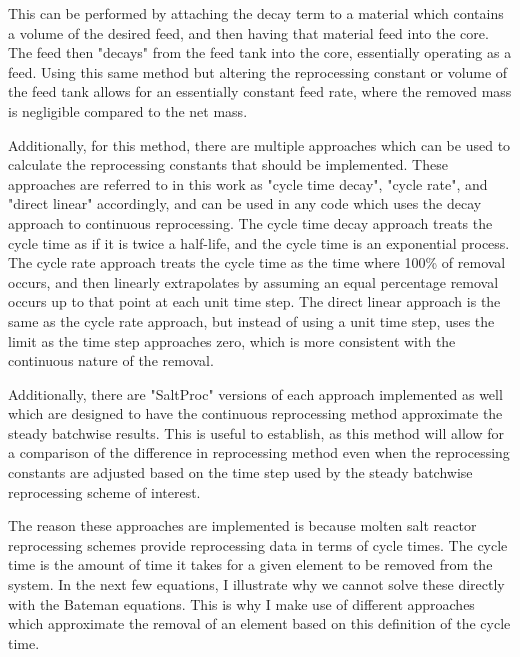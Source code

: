This can be performed by attaching the decay term to a material which contains a volume of the desired feed, and then having that material feed into the core. The feed then "decays" from the feed tank into the core, essentially operating as a feed. Using this same method but altering the reprocessing constant or volume of the feed tank allows for an essentially constant feed rate, where the removed mass is negligible compared to the net mass.

Additionally, for this method, there are multiple approaches which can be used to calculate the reprocessing constants that should be implemented. These approaches are referred to in this work as "cycle time decay", "cycle rate", and "direct linear" accordingly, and can be used in any code which uses the decay approach to continuous reprocessing. The cycle time decay approach treats the cycle time as if it is twice a half-life, and the cycle time is an exponential process. The cycle rate approach treats the cycle time as the time where 100\% of removal occurs, and then linearly extrapolates by assuming an equal percentage removal occurs up to that point at each unit time step. The direct linear approach is the same as the cycle rate approach, but instead of using a unit time step, uses the limit as the time step approaches zero, which is more consistent with the continuous nature of the removal.

Additionally, there are "SaltProc" versions of each approach implemented as well which are designed to have the continuous reprocessing method approximate the steady batchwise results. This is useful to establish, as this method will allow for a comparison of the difference in reprocessing method even when the reprocessing constants are adjusted based on the time step used by the steady batchwise reprocessing scheme of interest.

The reason these approaches are implemented is because molten salt reactor reprocessing schemes provide reprocessing data in terms of cycle times. The cycle time is the amount of time it takes for a given element to be removed from the system.
In the next few equations, I illustrate why we cannot solve these directly with the Bateman equations. This is why I make use of different approaches which approximate the removal of an element based on this definition of the cycle time.

